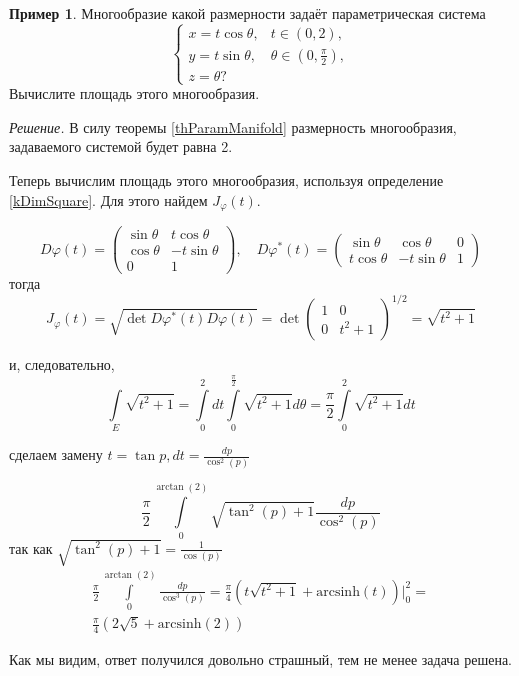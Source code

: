 \documentclass[a5paper]{article}
\newcounter{through}
\theoremstyle{plain}
\theoremstyle{definition}
\newtheorem{example}[through]{Пример}
\numberwithin{through}{section}
\numberwithin{equation}{section}
\begin{document}
\begin{example}\label{v-2N1c}
	Многообразие какой размерности задаёт параметрическая система
	\begin{equation*}
	\begin{cases}
	x = t\cos \theta, & t \in (0, 2), \\
	y = t\sin \theta, & \theta \in (0, \frac{\pi}{2}), \\
	z = \theta ?
	\end{cases}
	\end{equation*}
	Вычислите площадь этого многообразия.
	
	\textit{Решение.}
	В силу теоремы \ref{thParamManifold} размерность многообразия, задаваемого системой будет равна 2.
	
	Теперь вычислим площадь этого многообразия, используя определение \ref{kDimSquare}. Для этого найдем $J_\varphi(t)$. 
	
	\begin{equation*}
		D\varphi(t) = 
		\begin{pmatrix}
			\sin\theta & t\cos\theta \\
			\cos\theta & -t\sin\theta \\
			0 & 1
		\end{pmatrix}, 
		\quad
		D\varphi^*(t) = 
		\begin{pmatrix}
		\sin\theta & \cos\theta & 0 \\
		t\cos\theta & -t\sin\theta & 1
		\end{pmatrix}
	\end{equation*}
	тогда
	\begin{equation*}
		J_\varphi(t) =  \sqrt{\det D\varphi^*(t)D\varphi(t)} = \det
		\begin{pmatrix}
		1 & 0 \\
		0 & t^2 + 1
		\end{pmatrix}^{1/2}
		= \sqrt{t^2 + 1}
	\end{equation*}
	
	и, следовательно,
	\begin{equation*}
		\int\limits_E \sqrt{t^2 + 1} = \int\limits_{0}^{2}dt\int\limits_{0}^{\frac{\pi}{2}} \sqrt{t^2 + 1}d\theta = 
		 \frac{\pi}{2}\int\limits_{0}^{2} \sqrt{t^2 + 1} dt
	\end{equation*}
	
	сделаем замену $ t = \tan p, dt = \frac{dp}{\cos^2(p)} $
	
	\begin{equation*}
		\frac{\pi}{2}\int\limits_{0}^{\arctan(2)} \sqrt{\tan^2(p) + 1} \frac{dp}{\cos^2(p)}
	\end{equation*}
	так как $\sqrt{\tan^2(p) + 1} = \frac{1}{\cos(p)}$
	\begin{eqnarray}\nonumber
		\frac{\pi}{2}\int\limits_{0}^{\arctan(2)}  \frac{dp}{\cos^3(p)} = \frac{\pi}{4} \left( 
		t\sqrt{t^2 + 1} + \mathrm{arcsinh}(t) \right) \bigg|_0^{2} =\\\nonumber \frac{\pi}{4} \left( 2\sqrt{5} +  \mathrm{arcsinh}(2)\right)
	\end{eqnarray}
	
	Как мы видим, ответ получился довольно страшный, тем не менее задача решена.
\end{example}
\end{document}
